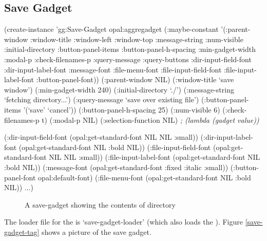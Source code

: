 \begin{group}
\section{Save Gadget}
\label{save-gadget}

\begin{programexample}
(create-instance 'gg:Save-Gadget opal:aggregadget
  (:maybe-constant '(:parent-window :window-title :window-left :window-top
		     :message-string :num-visible :initial-directory :button-panel-items
                     :button-panel-h-spacing :min-gadget-width :modal-p
                     :check-filenames-p :query-message :query-buttons
                     :dir-input-field-font :dir-input-label-font :message-font
                     :file-menu-font :file-input-field-font :file-input-label-font
                     :button-panel-font))
  (:parent-window NIL)
  (:window-title `save window')
  (:min-gadget-width 240)
  (:initial-directory `./')
  (:message-string `fetching directory...')
  (:query-message `save over existing file')
  (:button-panel-items '(`save' `cancel'))
  (:button-panel-h-spacing 25)
  (:num-visible 6)
  (:check-filenames-p t)
  (:modal-p NIL)
  (:selection-function NIL)   {\it ; (lambda (gadget value))}

  (:dir-input-field-font (opal:get-standard-font NIL NIL :small))
  (:dir-input-label-font (opal:get-standard-font NIL :bold NIL))
  (:file-input-field-font (opal:get-standard-font NIL NIL :small))
  (:file-input-label-font (opal:get-standard-font NIL :bold NIL))
  (:message-font (opal:get-standard-font :fixed :italic :small))
  (:button-panel-font opal:default-font)
  (:file-menu-font (opal:get-standard-font NIL :bold NIL))
  ...)
\end{programexample}
\end{group}

\begin{figure}
\begin{center}
\end{center}
\caption{A save-gadget showing the contents of directory }
\end{figure}

The loader file for the  is `save-gadget-loader' (which also
loads the ).
Figure \ref{save-gadget-tag} shows a picture of the save gadget.

